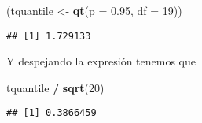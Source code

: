 \documentclass[
  12pt,
]{book}
\newenvironment{Shaded}{\begin{snugshade}}{\end{snugshade}}
\newcommand{\DataTypeTok}[1]{\textcolor[rgb]{0.13,0.29,0.53}{#1}}
\newcommand{\DecValTok}[1]{\textcolor[rgb]{0.00,0.00,0.81}{#1}}
\newcommand{\FloatTok}[1]{\textcolor[rgb]{0.00,0.00,0.81}{#1}}
\newcommand{\KeywordTok}[1]{\textcolor[rgb]{0.13,0.29,0.53}{\textbf{#1}}}
\newcommand{\NormalTok}[1]{#1}
\newcommand{\OperatorTok}[1]{\textcolor[rgb]{0.81,0.36,0.00}{\textbf{#1}}}
\newcommand{\StringTok}[1]{\textcolor[rgb]{0.31,0.60,0.02}{#1}}
\begin{document}
\begin{Shaded}
\begin{Highlighting}[]
\NormalTok{(tquantile \textless{}{-}}\StringTok{ }\KeywordTok{qt}\NormalTok{(}\DataTypeTok{p =} \FloatTok{0.95}\NormalTok{, }\DataTypeTok{df =} \DecValTok{19}\NormalTok{))}
\end{Highlighting}
\end{Shaded}

\begin{verbatim}
## [1] 1.729133
\end{verbatim}

Y despejando la expresión tenemos que

\begin{Shaded}
\begin{Highlighting}[]
\NormalTok{tquantile }\OperatorTok{/}\StringTok{ }\KeywordTok{sqrt}\NormalTok{(}\DecValTok{20}\NormalTok{)}
\end{Highlighting}
\end{Shaded}

\begin{verbatim}
## [1] 0.3866459
\end{verbatim}

\printbibliography
\end{document}
